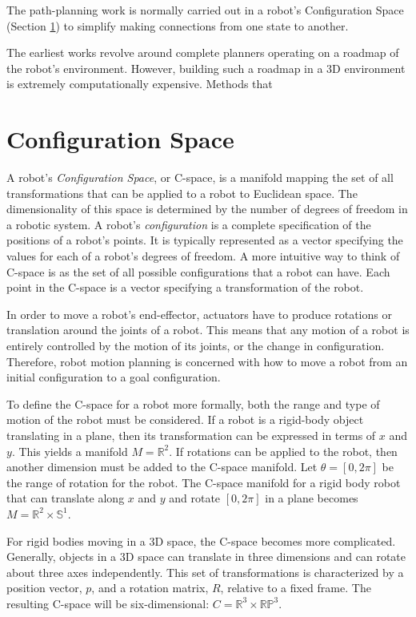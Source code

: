 \documentclass[10pt,conference]{ieeeconf}
\begin{document}
	The path-planning work is normally carried out in a robot's Configuration Space (Section \ref{sec:C-space}) to simplify making connections from one state to another. 
	
	The earliest works revolve around complete planners operating on a roadmap of the robot's environment. However, building such a roadmap in a 3D environment is extremely computationally expensive. Methods that 

	
\section{Configuration Space}\label{sec:C-space}

A robot's \emph{Configuration Space}, or C-space, is a manifold mapping the set of all transformations that can be applied to a robot to Euclidean space. The dimensionality of this space is determined by the number of degrees of freedom in a robotic system. A robot's \emph{configuration} is a complete specification of the positions of a robot's points. It is typically represented as a vector specifying the values for each of a robot's degrees of freedom. A more intuitive way to think of C-space is as the set of all possible configurations that a robot can have. Each point in the C-space is a vector specifying a transformation of the robot.

In order to move a robot's end-effector, actuators have to produce rotations or translation around the joints of a robot. This means that any motion of a robot is entirely controlled by the motion of its joints, or the change in configuration. Therefore, robot motion planning is concerned with how to move a robot from an initial configuration to a goal configuration.
    
    To define the C-space for a robot more formally, both the range and type of motion of the robot must be considered. If a robot is a rigid-body object translating in a plane, then its transformation can be expressed in terms of $x$ and $y$. This yields a manifold $M=\mathbb{R}^2$. If rotations can be applied to the robot, then another dimension must be added to the C-space manifold. Let $\theta=[0, 2\pi]$ be the range of rotation for the robot. The C-space manifold for a rigid body robot that can translate along $x$ and  $y$ and rotate $[0, 2\pi]$ in a plane becomes $M=\mathbb{R}^2 \times \mathbb{S}^1$.
    
    For rigid bodies moving in a 3D space, the C-space becomes more complicated. Generally, objects in a 3D space can translate in three dimensions and can rotate about three axes independently. This set of transformations is characterized by a position vector, $p$, and a rotation matrix, $R$, relative to a fixed frame. The resulting C-space will be six-dimensional: $C=\mathbb{R}^3 \times \mathbb{R}\mathbb{P}^3$. 
    
\end{document}
